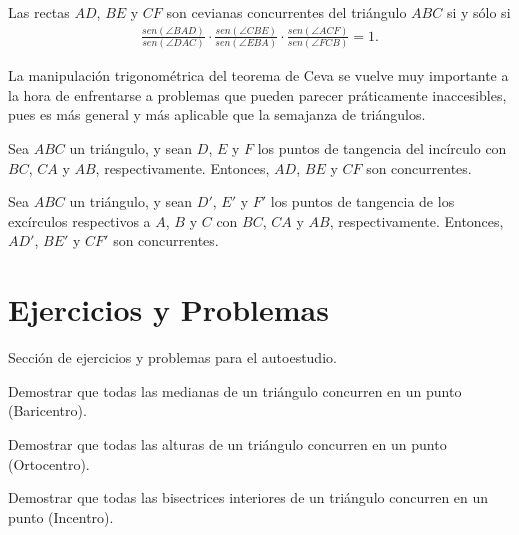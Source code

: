 \begin{section-theorem.tcb}
    Las rectas $AD$, $BE$ y $CF$ son cevianas concurrentes del triángulo $ABC$ si y sólo si
    \begin{gather*}
        \frac{sen(\angle BAD)}{sen(\angle DAC)} \cdot \frac{sen(\angle CBE)}{sen(\angle EBA)} \cdot \frac{sen(\angle ACF)}{sen(\angle FCB)} = 1.
    \end{gather*}
\end{section-theorem.tcb}

La manipulación trigonométrica del teorema de Ceva se vuelve muy importante a la hora de enfrentarse a problemas que pueden parecer práticamente inaccesibles, pues es más general y más aplicable que la semajanza de triángulos.

\begin{section-definition.tcb}
    Sea $ABC$ un triángulo, y sean $D$, $E$ y $F$ los puntos de tangencia del incírculo con $BC$, $CA$ y $AB$, respectivamente.
    Entonces, $AD$, $BE$ y $CF$ son concurrentes.
\end{section-definition.tcb}

\begin{section-definition.tcb}
    Sea $ABC$ un triángulo, y sean $D'$, $E'$ y $F'$ los puntos de tangencia de los excírculos respectivos a $A$, $B$ y $C$ con $BC$, $CA$ y $AB$, respectivamente.
    Entonces, $AD'$, $BE'$ y $CF'$ son concurrentes.
\end{section-definition.tcb}




\section{Ejercicios y Problemas}
Sección de ejercicios y problemas para el autoestudio.

\begin{section-exercise}
    Demostrar que todas las medianas de un triángulo concurren en un punto (Baricentro).
\end{section-exercise}

\begin{section-exercise}
    Demostrar que todas las alturas de un triángulo concurren en un punto (Ortocentro).
\end{section-exercise}

\begin{section-exercise}
    Demostrar que todas las bisectrices interiores de un triángulo concurren en un punto (Incentro).
\end{section-exercise}

